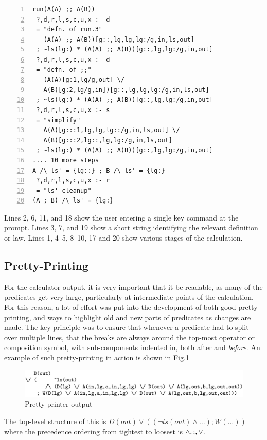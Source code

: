 \begin{lstlisting}[basicstyle=\ttfamily, numbers=left, numberstyle=\tiny, numbersep=5pt]
run(A(A) ;; A(B))
 ?,d,r,l,s,c,u,x :- d
 = "defn. of run.3"
   (A(A) ;; A(B))[g::,lg,lg,lg:/g,in,ls,out]
 ; ~ls(lg:) * (A(A) ;; A(B))[g::,lg,lg:/g,in,out]
 ?,d,r,l,s,c,u,x :- d
 = "defn. of ;;"
   (A(A)[g:1,lg/g,out] \/
   A(B)[g:2,lg/g,in])[g::,lg,lg,lg:/g,in,ls,out]
 ; ~ls(lg:) * (A(A) ;; A(B))[g::,lg,lg:/g,in,out]
 ?,d,r,l,s,c,u,x :- s
 = "simplify"
   A(A)[g:::1,lg,lg,lg::/g,in,ls,out] \/
   A(B)[g:::2,lg::,lg,lg:/g,in,ls,out]
 ; ~ls(lg:) * (A(A) ;; A(B))[g::,lg,lg:/g,in,out]
.... 10 more steps
A /\ ls' = {lg::} ; B /\ ls' = {lg:}
 ?,d,r,l,s,c,u,x :- r
 = "ls'-cleanup"
(A ; B) /\ ls' = {lg:}
\end{lstlisting}
Lines 2, 6, 11, and 18 show the user entering a single key command at the prompt.
Lines 3, 7, and 19 show a short string identifying the relevant definition
or law.
Lines 1, 4--5, 8--10, 17 and 20 show various stages of the calculation.



\subsection{Pretty-Printing}\label{ssec:pp}

For the calculator output,
it is very important that it be readable,
as many of the predicates get very large,
particularly at intermediate points of the calculation.
For this reason, a lot of effort was put into the development
of both good pretty-printing,
and ways to highlight old and new parts of predicates as changes are made.
The key principle was to ensure that whenever a predicate
had to split over multiple lines,
that the breaks are always around the top-most operator or composition
symbol, with sub-components indented in, both after and \emph{before}.
An example of such pretty-printing in action is shown in Fig.\ref{fig:pp-out}
\begin{figure}
  \centering
  \includegraphics[scale=0.155]{pprint-xmpl.eps}
  \caption{Pretty-printer output}\label{fig:pp-out}
\end{figure}
The top-level structure of this is
$D(out) \lor ( (\lnot ls(out) \land \dots) ; W(\dots) )$
where the precedence ordering from tightest to loosest is $\land,\mathrel{;},\lor$.

